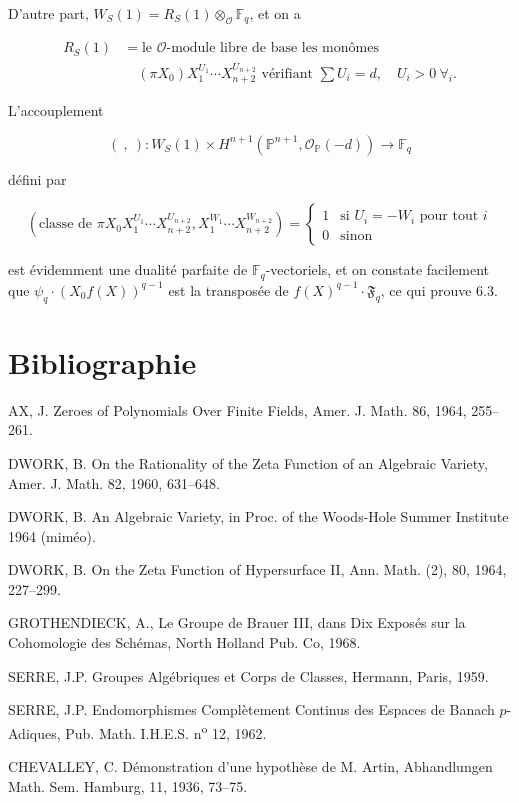 D'autre part, $W_S(1)=R_S(1)\otimes_{\mathcal O}\mathbb F_q$, et on a

\begin{equation}\tag{6.3.5}
\begin{aligned}
R_S(1)
&=\text{le $\mathcal O$-module libre de base les monômes}\\
&\quad
(\pi X_0)X_1^{U_1}\cdots X_{n+2}^{U_{n+2}}
\text{ vérifiant }
\sum U_i=d,\quad U_i>0\ \forall_i.
\end{aligned}
\end{equation}

L'accouplement

\begin{equation}\tag{6.3.6}
(\ ,\ ):
W_S(1)\times
H^{n+1}(\mathbb P^{n+1},\mathcal O_{\mathbb P}(-d))
\longrightarrow\mathbb F_q
\end{equation}

défini par

\begin{equation}\tag{6.3.7}
\left(
\text{classe de }\pi X_0X_1^{U_1}\cdots X_{n+2}^{U_{n+2}},
X_1^{W_1}\cdots X_{n+2}^{W_{n+2}}
\right)
=
\begin{cases}
1&\text{si }U_i=-W_i\text{ pour tout }i\\
0&\text{sinon}
\end{cases}
\end{equation}

est évidemment une dualité parfaite de $\mathbb F_q$-vectoriels, et on
constate facilement que $\psi_q\cdot(X_0f(X))^{q-1}$ est la transposée de
$f(X)^{q-1}\cdot \mathfrak F_q$, ce qui prouve 6.3.


\section*{Bibliographie}

\begin{enumerate}[label={[\arabic*]},leftmargin=2.4em]
\item AX, J. Zeroes of Polynomials Over Finite Fields,
  Amer. J. Math. 86, 1964, 255--261.
\item DWORK, B. On the Rationality of the Zeta Function of an
  Algebraic Variety, Amer. J. Math. 82, 1960, 631--648.
\item DWORK, B. An Algebraic Variety, in Proc. of the Woods-Hole
  Summer Institute 1964 (miméo).
\item DWORK, B. On the Zeta Function of Hypersurface II,
  Ann. Math. (2), 80, 1964, 227--299.
\item GROTHENDIECK, A., Le Groupe de Brauer III, dans
  Dix Exposés sur la Cohomologie des Schémas,
  North Holland Pub. Co, 1968.
\item SERRE, J.P. Groupes Algébriques et Corps de Classes,
  Hermann, Paris, 1959.
\item SERRE, J.P. Endomorphismes Complètement Continus des Espaces
  de Banach $p$-Adiques, Pub. Math. I.H.E.S. n\textsuperscript{o} 12, 1962.
\item CHEVALLEY, C. Démonstration d'une hypothèse de M. Artin,
  Abhandlungen Math. Sem. Hamburg, 11, 1936, 73--75.
\end{enumerate}
